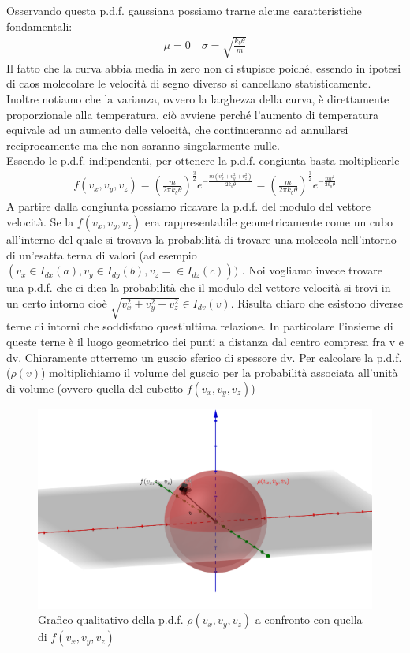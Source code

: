 \documentclass[10pt,a4paper]{article}
\begin{document}
Osservando questa p.d.f. gaussiana possiamo trarne alcune caratteristiche fondamentali: 
\begin{align*} 
	\mu = 0 \quad \sigma = \sqrt{\frac{k_b \theta}{m}}
\end{align*} 
Il fatto che la curva abbia media in zero non ci stupisce poiché, essendo in ipotesi di caos molecolare le velocità di segno diverso si cancellano statisticamente. Inoltre notiamo che la varianza, ovvero la larghezza della curva, è direttamente proporzionale alla temperatura, ciò avviene perché l'aumento di temperatura equivale ad un aumento delle velocità, che continueranno ad annullarsi reciprocamente ma che non saranno singolarmente nulle.\\
Essendo le p.d.f. indipendenti, per ottenere la p.d.f. congiunta basta moltiplicarle
\begin{align*} 
	f(v_x, v_y,v_z) = \left(\frac{m}{2\pi k_b\theta}\right)^{\frac{3}{2}} e^{-\frac{m( v_x^2+v_y^2+v_z^2)}{2 k_b \theta}} = \left(\frac{m}{2\pi k_b\theta}\right)^{\frac{3}{2}} e^{-\frac{m v^2}{2 k_b \theta}}
\end{align*} 
A partire dalla congiunta possiamo ricavare la p.d.f. del modulo del vettore velocità. Se la $f(v_x, v_y,v_z)$ era rappresentabile geometricamente come un cubo all'interno del quale si trovava la probabilità di trovare una molecola nell'intorno di un'esatta terna di valori (ad esempio $(v_x \in I_{dx}(a), v_y \in I_{dy}(b), v_z = \in I_{dz}(c)))$ . Noi vogliamo invece trovare una p.d.f. che ci dica la probabilità che il modulo del vettore velocità si trovi in un certo intorno cioè $ \sqrt{v_x^2+v_y^2+v_z^2} \in I_{dv}(v)$. Risulta chiaro che esistono diverse terne di intorni che soddisfano quest'ultima relazione. In particolare l'insieme di queste terne è il luogo geometrico dei punti a distanza dal centro compresa fra v e dv. Chiaramente otterremo un guscio sferico di spessore dv. Per calcolare la p.d.f. ($\rho(v)$) moltiplichiamo il volume del guscio per la probabilità associata all'unità di volume (ovvero quella del cubetto $f(v_x,v_y, v_z)$)
\begin{figure}[h!]
	\centering
	\includegraphics[width=0.7\linewidth]{../images/guscio}
	\caption{Grafico qualitativo della p.d.f. $\rho(v_x,v_y,v_z)$ a confronto con quella di $f(v_x, v_y, v_z)$}
	\label{fig:guscio}
\end{figure}
\end{document}
